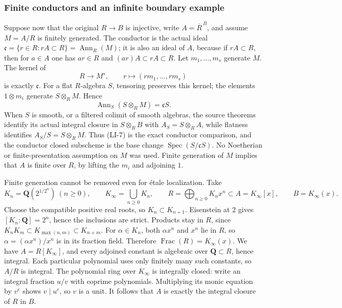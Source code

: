 \subsubsection{Finite conductors and an infinite boundary example}\label{algebra-proof-054-finite-conductors-and-an-infinite-boundary-example}

Suppose now that the original \(R\to B\) is injective, write \(A=\overline R^{\,B}\), and assume \(M=A/R\) is finitely generated. The conductor is the actual ideal \(\mathfrak c=\{r\in R:rA\subset R\}=\operatorname{Ann}_R(M)\); it is also an ideal of \(A\), because if \(rA\subset R\), then for \(a\in A\) one has \(ar\in R\) and \((ar)A\subset rA\subset R\). Let \(m_1,\ldots,m_s\) generate \(M\). The kernel of \[
R\longrightarrow M^s,\qquad r\longmapsto(rm_1,\ldots,rm_s)
\] is exactly \(\mathfrak c\). For a flat \(R\)-algebra \(S\), tensoring preserves this kernel; the elements \(1\otimes m_i\) generate \(S\otimes_RM\). Hence \[
\operatorname{Ann}_S(S\otimes_RM)=\mathfrak cS.
\tag{LI-7}
\] When \(S\) is smooth, or a filtered colimit of smooth algebras, the source theorems identify its actual integral closure in \(S\otimes_R B\) with \(A_S=S\otimes_RA\), while flatness identifies \(A_S/S=S\otimes_RM\). Thus (LI-7) is the exact conductor comparison, and the conductor closed subscheme is the base change \(\operatorname{Spec}(S/\mathfrak cS)\). No Noetherian or finite-presentation assumption on \(M\) was used. Finite generation of \(M\) implies that \(A\) is finite over \(R\), by lifting the \(m_i\) and adjoining \(1\).

Finite generation cannot be removed even for étale localization. Take \[
K_n=\mathbf Q(2^{1/2^n})\ (n\geq0),\qquad
K_\infty=\bigcup_{n\geq0}K_n,\qquad
R=\bigoplus_{n\geq0}K_nx^n\subset A=K_\infty[x],\qquad
B=K_\infty(x).
\] Choose the compatible positive real roots, so \(K_n\subset K_{n+1}\). Eisenstein at \(2\) gives \([K_n:\mathbf Q]=2^n\), hence the inclusions are strict. Products stay in \(R\), since \(K_nK_m\subset K_{\max(n,m)}\subset K_{n+m}\). For \(\alpha\in K_n\), both \(\alpha x^n\) and \(x^n\) lie in \(R\), so \(\alpha=(\alpha x^n)/x^n\) is in its fraction field. Therefore \(\operatorname{Frac}(R)=K_\infty(x)\). We have \(A=R[K_\infty]\), and every adjoined constant is algebraic over \(\mathbf Q\subset R\), hence integral. Each particular polynomial uses only finitely many such constants, so \(A/R\) is integral. The polynomial ring over \(K_\infty\) is integrally closed: write an integral fraction \(u/v\) with coprime polynomials. Multiplying its monic equation by \(v^e\) shows \(v\mid u^e\), so \(v\) is a unit. It follows that \(A\) is exactly the integral closure of \(R\) in \(B\).

